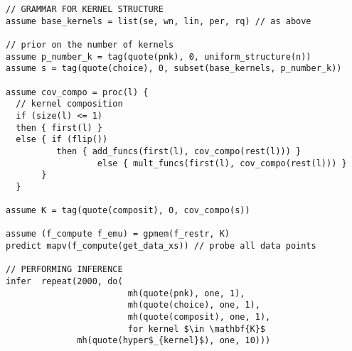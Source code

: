 \begin{mdframed}
\begin{minipage}{\linewidth}
\small
\belowcaptionskip=-10pt
\begin{lstlisting}[mathescape,label=alg:structureVent,basicstyle=\selectfont\ttfamily,caption={Kernel Structure Learning},numbers=none]
// GRAMMAR FOR KERNEL STRUCTURE
assume base_kernels = list(se, wn, lin, per, rq) // as above

// prior on the number of kernels
assume p_number_k = tag(quote(pnk), 0, uniform_structure(n))
assume s = tag(quote(choice), 0, subset(base_kernels, p_number_k))

assume cov_compo = proc(l) {
  // kernel composition
  if (size(l) <= 1)
  then { first(l) }
  else { if (flip()) 
		  then { add_funcs(first(l), cov_compo(rest(l))) }
                  else { mult_funcs(first(l), cov_compo(rest(l))) }
       }
  }
                          
assume K = tag(quote(composit), 0, cov_compo(s))

assume (f_compute f_emu) = gpmem(f_restr, K)
predict mapv(f_compute(get_data_xs)) // probe all data points

// PERFORMING INFERENCE  
infer  repeat(2000, do(
                        mh(quote(pnk), one, 1),
                        mh(quote(choice), one, 1),
                        mh(quote(composit), one, 1),
                        for kernel $\in \mathbf{K}$ 
			  mh(quote(hyper$_{kernel}$), one, 10)))
\end{lstlisting}
\end{minipage}
\end{mdframed}